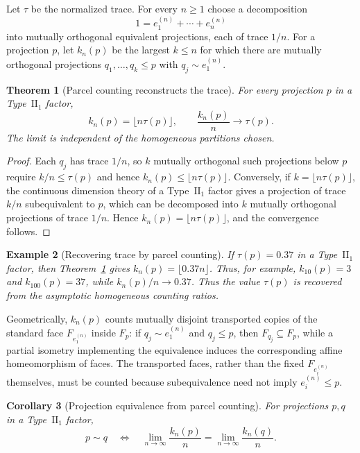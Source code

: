 \documentclass[11pt]{article}
\newtheorem{theorem}{Theorem}[section]
\newtheorem{example}[theorem]{Example}
\newtheorem{corollary}[theorem]{Corollary}
\begin{document}
Let $\tau$ be the normalized trace. For every $n\geq1$ choose a
decomposition
\[
1=e_1^{(n)}+\cdots+e_n^{(n)}
\]
into mutually orthogonal equivalent projections, each of trace $1/n$.
For a projection $p$, let $k_n(p)$ be the largest $k\leq n$ for which
there are mutually orthogonal projections $q_1,\ldots,q_k\leq p$ with
$q_j\sim e_1^{(n)}$.

\begin{theorem}[Parcel counting reconstructs the trace]
\label{thm:convergence}
For every projection $p$ in a Type~$\mathrm{II}_1$ factor,
\[
k_n(p)=\lfloor n\tau(p)\rfloor,
\qquad
\frac{k_n(p)}{n}\longrightarrow\tau(p).
\]
The limit is independent of the homogeneous partitions chosen.
\end{theorem}

\begin{proof}
Each $q_j$ has trace $1/n$, so $k$ mutually orthogonal such projections
below $p$ require $k/n\leq\tau(p)$ and hence
$k_n(p)\leq\lfloor n\tau(p)\rfloor$. Conversely, if
$k=\lfloor n\tau(p)\rfloor$, the continuous dimension theory of a
Type~$\mathrm{II}_1$ factor gives a projection of trace $k/n$
subequivalent to $p$, which can be decomposed into $k$ mutually
orthogonal projections of trace $1/n$. Hence
$k_n(p)=\lfloor n\tau(p)\rfloor$, and the convergence follows.
\end{proof}
\begin{example}[Recovering trace by parcel counting]
If $\tau(p)=0.37$ in a Type~$\mathrm{II}_1$ factor, then
Theorem~\ref{thm:convergence} gives
$k_n(p)=\lfloor0.37n\rfloor$. Thus, for example,
$k_{10}(p)=3$ and $k_{100}(p)=37$, while
$k_n(p)/n\to0.37$. Thus the value $\tau(p)$ is recovered from the asymptotic homogeneous
counting ratios.
\end{example}
Geometrically, $k_n(p)$ counts mutually disjoint transported copies of
the standard face $F_{e_1^{(n)}}$ inside $F_p$: if
$q_j\sim e_1^{(n)}$ and $q_j\leq p$, then $F_{q_j}\subseteq F_p$, while
a partial isometry implementing the equivalence induces the corresponding
affine homeomorphism of faces. The transported faces, rather than the
fixed $F_{e_i^{(n)}}$ themselves, must be counted because
subequivalence need not imply $e_i^{(n)}\leq p$.

\begin{corollary}[Projection equivalence from parcel counting]
\label{cor:equivcounting}
For projections $p,q$ in a Type~$\mathrm{II}_1$ factor,
\[
p\sim q
\quad\Longleftrightarrow\quad
\lim_{n\to\infty}\frac{k_n(p)}n
=
\lim_{n\to\infty}\frac{k_n(q)}n.
\]
\end{corollary}
\end{document}
